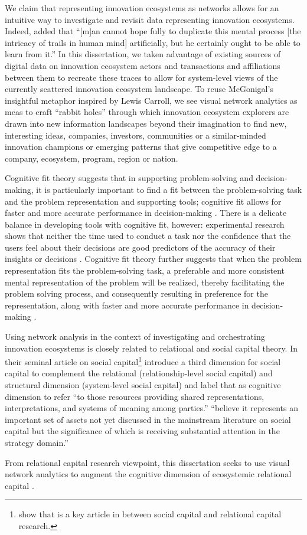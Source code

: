 We claim that representing innovation ecosystems as networks allows for an intuitive way to investigate and revisit data representing innovation ecosystems. Indeed, \cite{Bush1945AsThink} added that ``[m]an cannot hope fully to duplicate this mental process [the intricacy of trails in human mind] artificially, but he certainly ought to be able to learn from it.'' In this dissertation, we taken advantage of existing sources of digital data on innovation ecosystem actors and transactions and affiliations between them to recreate these traces to allow for system-level views of the currently scattered innovation ecosystem landscape. To reuse McGonigal’s \citeyearpar{McGonigal2005} insightful metaphor inspired by Lewis Carroll, we see visual network analytics as meas to craft ``rabbit holes'' through which innovation ecosystem explorers are drawn into new information landscapes beyond their imagination to find new, interesting ideas, companies, investors, communities or a similar-minded innovation champions \citep[cf.][]{Huhtamaki2007CommunityEcosystem} or emerging patterns that give competitive edge to a company, ecosystem, program, region or nation.

Cognitive fit theory suggests that in supporting problem-solving and decision-making, it is particularly important to find a fit between the problem-solving task and the problem representation and supporting tools; cognitive fit allows for faster and more accurate performance in decision-making \citep{Vessey1991}. There is a delicate balance in developing tools with cognitive fit, however: experimental research shows that neither the time used to conduct a task nor the confidence that the users feel about their decisions are good predictors of the accuracy of their insights or decisions \citep[cf.][]{Dunn2001}. Cognitive fit theory further suggests that when the problem representation fits the problem-solving task, a preferable and more consistent mental representation of the problem will be realized, thereby facilitating the problem solving process, and consequently resulting in preference for the representation, along with faster and more accurate performance in decision-making \citep{Basole2016EnablingAnalysis}.

Using network analysis in the context of investigating and orchestrating innovation ecosystems is closely related to relational and social capital theory. In their seminal article on social capital\footnote{\cite{Still2013relationalsocialcapital} show that \cite{Nahapiet1998} is a key article in between social capital and relational capital research.} \cite{Nahapiet1998} introduce a third dimension  for social capital to complement the relational (relationship-level social capital) and structural dimension (system-level social capital) and label that as cognitive dimension to refer ``to those resources providing shared representations, interpretations, and systems of meaning among parties.'' \cite{Nahapiet1998} ``believe it represents an important set of assets not yet discussed in the mainstream literature on social capital but the significance of which is receiving substantial attention in the strategy domain.''

From relational capital research viewpoint, this dissertation seeks to use visual network analytics to augment the cognitive dimension of ecosystemic relational capital \citep{Still2014EcosystemicRelationalCapital}.